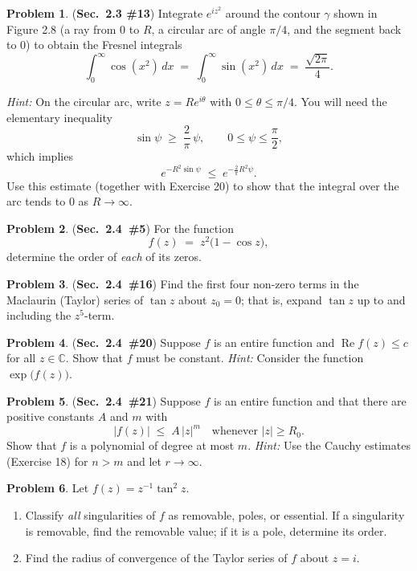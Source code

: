 \documentclass[10pt]{article}
\theoremstyle{definition} %
\newtheorem{problem}{Problem}
\theoremstyle{plain} %
\begin{document}
\begin{problem}
  (\textbf{Sec.\ 2.3 \#13})\; Integrate \(e^{iz^{2}}\) around the contour \(\gamma\) shown in Figure 2.8 (a ray from \(0\) to \(R\), a circular arc of angle \(\pi/4\), and the segment back to \(0\)) to obtain the Fresnel integrals
  \[
      \int_{0}^{\infty} \cos(x^{2})\,dx 
      \;=\; 
      \int_{0}^{\infty} \sin(x^{2})\,dx 
      \;=\; 
      \frac{\sqrt{2\pi}}{4}.
  \]

  \textit{Hint:}  
  On the circular arc, write \(z = Re^{i\theta}\) with \(0 \le \theta \le \pi/4\).  
  You will need the elementary inequality
  \[
      \sin\psi \;\ge\; \frac{2}{\pi}\,\psi,
      \qquad 0 \le \psi \le \frac{\pi}{2},
  \]
  which implies
  \[
      e^{-R^{2}\sin\psi}
      \;\le\;
      e^{-\tfrac{2}{\pi}R^{2}\psi}.
  \]
  Use this estimate (together with Exercise 20) to show that the integral over the arc tends to \(0\) as \(R \to \infty\).
\end{problem}
\begin{problem}
  (\textbf{Sec.\ 2.4 \#5})\;
  For the function
  \[
      f(z)\;=\;z^{2}\bigl(1-\cos z\bigr),
  \]
  determine the order of \emph{each} of its zeros.
\end{problem}

\begin{problem}
  (\textbf{Sec.\ 2.4 \#16})\;
  Find the first four non‑zero terms in the Maclaurin (Taylor) series of \(\tan z\) about \(z_{0}=0\); that is, expand \(\tan z\) up to and including the \(z^{5}\)-term.
\end{problem}

\begin{problem}
  (\textbf{Sec.\ 2.4 \#20})\;
  Suppose \(f\) is an entire function and \(\operatorname{Re} f(z)\le c\) for all \(z\in\mathbb{C}\).  
  Show that \(f\) must be constant.  
  \textit{Hint:} Consider the function \(\exp\!\bigl(f(z)\bigr)\).
\end{problem}

\begin{problem}
  (\textbf{Sec.\ 2.4 \#21})\;
  Suppose \(f\) is an entire function and that there are positive constants \(A\) and \(m\) with
  \[
      \lvert f(z)\rvert \;\le\; A\,\lvert z\rvert^{m}
      \quad\text{whenever } \lvert z\rvert \ge R_{0}.
  \]
  Show that \(f\) is a polynomial of degree at most \(m\).  
  \textit{Hint:} Use the Cauchy estimates (Exercise 18) for \(n>m\) and let \(r\to\infty\).
\end{problem}
\begin{problem}
  Let \(f(z)=z^{-1}\tan^{2}z\).
  \begin{enumerate}[label=(\alph*)]
      \item Classify \emph{all} singularities of \(f\) as removable, poles, or essential.  
            If a singularity is removable, find the removable value;  
            if it is a pole, determine its order.
      \item Find the radius of convergence of the Taylor series of \(f\) about \(z=i\).
  \end{enumerate}
\end{problem}
\end{document}
